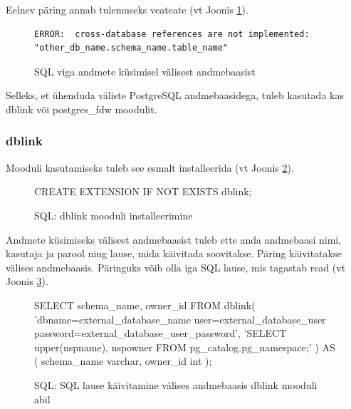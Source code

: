 \documentclass[a4paper,12pt]{article} %
\begin{document}
Eelnev päring annab tulemuseks veateate (vt Joonis \ref{fig_sql_viga_andmete_küsimisel_välisest_andmebaasist}).
\begin{figure}[H]
\centering
\begin{lstlisting}
ERROR:  cross-database references are not implemented: "other_db_name.schema_name.table_name"
\end{lstlisting}
\caption{SQL viga andmete küsimisel välisest andmebaasist}
\label{fig_sql_viga_andmete_küsimisel_välisest_andmebaasist}
\end{figure}

Selleks, et ühenduda väliste PostgreSQL andmebaasidega, tuleb kasutada kas dblink või postgres\_fdw moodulit.

\subsubsection{dblink}
\label{dblink}
Mooduli kasutamiseks tuleb see esmalt installeerida (vt Joonis \ref{fig_sql_dblink_mooduli_installeerimine}).
\begin{figure}[H]
\centering
\begin{SQL}
CREATE EXTENSION IF NOT EXISTS dblink;
\end{SQL}
\caption{SQL: dblink mooduli installeerimine}
\label{fig_sql_dblink_mooduli_installeerimine}
\end{figure}
Andmete küsimiseks välisest andmebaasist tuleb ette anda andmebaasi nimi, kasutaja ja parool ning lause, mida käivitada soovitakse. Päring käivitatakse välises andmebaasis. Päringuks võib olla iga SQL lause, mis tagastab read (vt Joonis \ref{fig_sql_sql_lause_käivitamine_välises_andmebaasis_dblink_mooduli_abil}). \cite{PostgreSQLdblink}
\begin{figure}[H]
\centering
\begin{SQL}
SELECT schema_name, owner_id
FROM dblink(
  'dbname=external_database_name user=external_database_user password=external_database_user_password',
  'SELECT upper(nspname), nspowner FROM pg_catalog.pg_namespace;'
) AS (
  schema_name varchar,
  owner_id int
);
\end{SQL}
\caption{SQL: SQL lause käivitamine välises andmebaasis dblink mooduli abil}
\label{fig_sql_sql_lause_käivitamine_välises_andmebaasis_dblink_mooduli_abil}
\end{figure}
\end{document}
